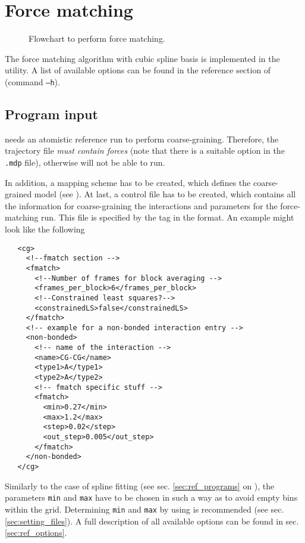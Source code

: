 \chapter{Force matching}
\begin{figure}
   \centering
   \caption{Flowchart to perform force matching.}
\end{figure}
The force matching algorithm with cubic spline basis is implemented in the  utility. A list of available options can be found in the reference section of  (command \texttt{--h}).

\section{Program input}
 needs an atomistic reference run to perform coarse-graining. Therefore, the trajectory file {\em must contain forces } (note that there is a suitable option in the \gromacs \texttt{.mdp} file), otherwise  will not be able to run.

In addition, a mapping scheme has to be created, which defines the coarse-grained model (see ). At last, a control file has to be created, which contains all the information for coarse-graining the interactions and parameters for the force-matching run. This file is specified by the tag  in the \xml format. An example might look like the following
\begin{lstlisting}
   <cg>
     <!--fmatch section -->
     <fmatch>
       <!--Number of frames for block averaging -->
       <frames_per_block>6</frames_per_block>
       <!--Constrained least squares?-->
       <constrainedLS>false</constrainedLS>
     </fmatch>
     <!-- example for a non-bonded interaction entry -->
     <non-bonded>
       <!-- name of the interaction -->
       <name>CG-CG</name>
       <type1>A</type1>
       <type2>A</type2>
       <!-- fmatch specific stuff -->
       <fmatch>
         <min>0.27</min>
         <max>1.2</max>
         <step>0.02</step>
         <out_step>0.005</out_step>
       </fmatch>
     </non-bonded>
   </cg>
\end{lstlisting}
Similarly to the case of spline fitting (see sec. \ref{sec:ref_programs} on ), the parameters \texttt{min} and \texttt{max} have to be chosen in such a way as to avoid empty bins within the grid. Determining \texttt{min} and \texttt{max} by using  is recommended (see sec. \ref{sec:setting_files}). A full description of all available options can be found in sec. \ref{sec:ref_options}.

